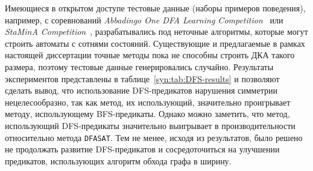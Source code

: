 Имеющиеся в открытом доступе тестовые данные (наборы примеров поведения), например, с соревнований \emph{Abbadingo One DFA Learning Competition}~\cite{DBLP:conf/icgi/LangPP98} или \emph{StaMinA Competition}~\cite{DBLP:journals/ese/WalkinshawLDBD13}, разрабатывались под неточные алгоритмы, которые могут строить автоматы с сотнями состояний.
Существующие и предлагаемые в рамках настоящей диссертации точные методы пока не способны строить ДКА такого размера, поэтому тестовые данные генерировались случайно.
Результаты экспериментов представлены в таблице~\ref{syn:tab:DFS-results} и позволяют сделать вывод, что использование DFS-предикатов нарушения симметрии нецелесообразно, так как метод, их использующий, значительно проигрывает методу, использующему BFS-предикаты.
Однако можно заметить, что метод, использующий DFS-предикаты значительно выигрывает в производительности относительно метода \texttt{DFASAT}.
Тем не менее, исходя из результатов, было решено не продолжать развитие DFS-предикатов и сосредоточиться на улучшении предикатов, использующих алгоритм обхода графа в ширину.

\begin{table}[ht]
  \caption{Медианное время работы методов генерации ДКА по заданным примерам поведения с использованием BFS-предикатов нарушения симметрии, DFS-предикатов нарушения симметрии и метода \texttt{DFASAT} в секундах, посчитанное на 100 задачах для каждого набора параметров. Время работы методов было ограничено одним часом ($\text{TL} = 3600\,\, \text{секунд}$)}
  \centering
  \label{syn:tab:DFS-results}
\end{table}

